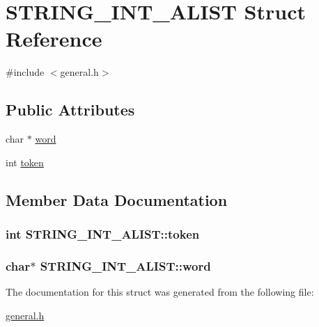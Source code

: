 \hypertarget{structSTRING__INT__ALIST}{}\section{S\+T\+R\+I\+N\+G\+\_\+\+I\+N\+T\+\_\+\+A\+L\+I\+ST Struct Reference}
\label{structSTRING__INT__ALIST}


{\ttfamily \#include $<$general.\+h$>$}

\subsection*{Public Attributes}
\begin{DoxyCompactItemize}
\item 
char $\ast$ \hyperlink{structSTRING__INT__ALIST_a15c2e03465b7de306b6f7f006fdcb8a5}{word}
\item 
int \hyperlink{structSTRING__INT__ALIST_ab1473f1b9d79478a271aa4947ab29b0e}{token}
\end{DoxyCompactItemize}


\subsection{Member Data Documentation}
\subsubsection[{\texorpdfstring{token}{token}}]{\setlength{\rightskip}{0pt plus 5cm}int S\+T\+R\+I\+N\+G\+\_\+\+I\+N\+T\+\_\+\+A\+L\+I\+S\+T\+::token}\hypertarget{structSTRING__INT__ALIST_ab1473f1b9d79478a271aa4947ab29b0e}{}\label{structSTRING__INT__ALIST_ab1473f1b9d79478a271aa4947ab29b0e}
\subsubsection[{\texorpdfstring{word}{word}}]{\setlength{\rightskip}{0pt plus 5cm}char$\ast$ S\+T\+R\+I\+N\+G\+\_\+\+I\+N\+T\+\_\+\+A\+L\+I\+S\+T\+::word}\hypertarget{structSTRING__INT__ALIST_a15c2e03465b7de306b6f7f006fdcb8a5}{}\label{structSTRING__INT__ALIST_a15c2e03465b7de306b6f7f006fdcb8a5}


The documentation for this struct was generated from the following file\+:\begin{DoxyCompactItemize}
\item 
\hyperlink{general_8h}{general.\+h}\end{DoxyCompactItemize}
